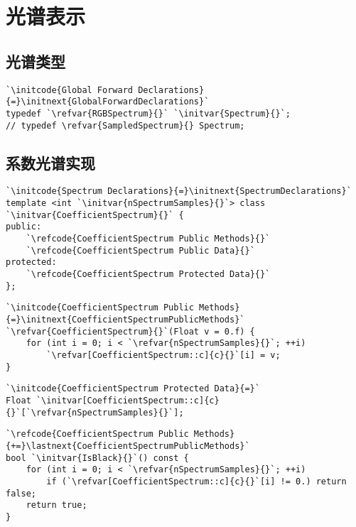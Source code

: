\section{光谱表示}\label{sec:光谱表示}

\subsection{光谱类型}\label{sub:光谱类型}
\begin{lstlisting}
`\initcode{Global Forward Declarations}{=}\initnext{GlobalForwardDeclarations}`
typedef `\refvar{RGBSpectrum}{}` `\initvar{Spectrum}{}`;
// typedef \refvar{SampledSpectrum}{} Spectrum;
\end{lstlisting}

\subsection{系数光谱实现}\label{sub:系数光谱实现}
\begin{lstlisting}
`\initcode{Spectrum Declarations}{=}\initnext{SpectrumDeclarations}`
template <int `\initvar{nSpectrumSamples}{}`> class `\initvar{CoefficientSpectrum}{}` {
public:
    `\refcode{CoefficientSpectrum Public Methods}{}`
    `\refcode{CoefficientSpectrum Public Data}{}`
protected:
    `\refcode{CoefficientSpectrum Protected Data}{}`
};
\end{lstlisting}

\begin{lstlisting}
`\initcode{CoefficientSpectrum Public Methods}{=}\initnext{CoefficientSpectrumPublicMethods}`
`\refvar{CoefficientSpectrum}{}`(Float v = 0.f) {
    for (int i = 0; i < `\refvar{nSpectrumSamples}{}`; ++i)
        `\refvar[CoefficientSpectrum::c]{c}{}`[i] = v;
}
\end{lstlisting}

\begin{lstlisting}
`\initcode{CoefficientSpectrum Protected Data}{=}`
Float `\initvar[CoefficientSpectrum::c]{c}{}`[`\refvar{nSpectrumSamples}{}`];
\end{lstlisting}

\begin{lstlisting}
`\refcode{CoefficientSpectrum Public Methods}{+=}\lastnext{CoefficientSpectrumPublicMethods}`
bool `\initvar{IsBlack}{}`() const {
    for (int i = 0; i < `\refvar{nSpectrumSamples}{}`; ++i)
        if (`\refvar[CoefficientSpectrum::c]{c}{}`[i] != 0.) return false;
    return true;
}
\end{lstlisting}